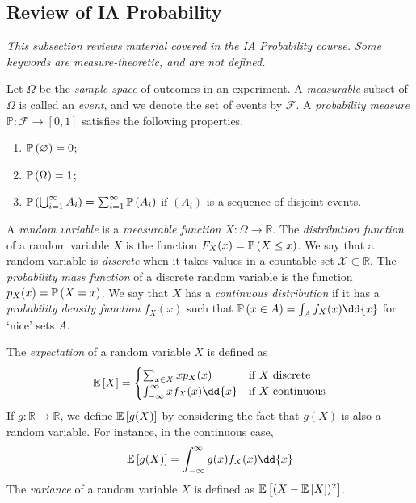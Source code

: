 \subsection{Review of IA Probability}
\textit{This subsection reviews material covered in the IA Probability course.
	Some keywords are measure-theoretic, and are not defined.}

Let $\Omega$ be the \textit{sample space} of outcomes in an experiment.
A \textit{measurable} subset of $\Omega$ is called an \textit{event}, and we denote the set of events by $\mathcal F$.
A \textit{probability measure} $\mathbb P \colon \mathcal F \to [0,1]$ satisfies the following properties.
\begin{enumerate}
	\item $\mathbb{P}\left({\varnothing}\right) = 0$;
	\item $\mathbb{P}\left({\Omega}\right) = 1$;
	\item $\mathbb{P}\left({\bigcup_{i = 1}^\infty A_i}\right) = \sum_{i=1}^\infty \mathbb{P}\left({A_i}\right)$ if $(A_i)$ is a sequence of disjoint events.
\end{enumerate}
A \textit{random variable} is a \textit{measurable function} $X \colon \Omega \to \mathbb R$.
The \textit{distribution function} of a random variable $X$ is the function $F_X(x) = \mathbb{P}\left({X \leq x}\right)$.
We say that a random variable is \textit{discrete} when it takes values in a countable set $\mathcal X \subset \mathbb R$.
The \textit{probability mass function} of a discrete random variable is the function $p_X(x) = \mathbb{P}\left({X = x}\right)$.
We say that $X$ has a \textit{continuous distribution} if it has a \textit{probability density function} $f_X(x)$ such that $\prob{x \in A} = \int_A f_X(x) \dd{x}$ for `nice' sets $A$.

The \textit{expectation} of a random variable $X$ is defined as
\begin{align*}
	\expect{X} = \begin{cases}
		\sum_{x \in X} x p_X(x)               & \text{if } X \text{ discrete}   \\
		\int_{-\infty}^\infty x f_X(x) \dd{x} & \text{if } X \text{ continuous}
	\end{cases}
\end{align*}
If $g \colon \mathbb R \to \mathbb R$, we define $\mathbb{E}\left[{g(X)}\right]$ by considering the fact that $g(X)$ is also a random variable.
For instance, in the continuous case,
\begin{align*}
	\expect{g(X)} = \int_{-\infty}^\infty g(x) f_X(x) \dd{x}
\end{align*}
The \textit{variance} of a random variable $X$ is defined as $\mathbb{E}\left[{(X - \mathbb{E}\left[{X}\right])^2}\right]$.

